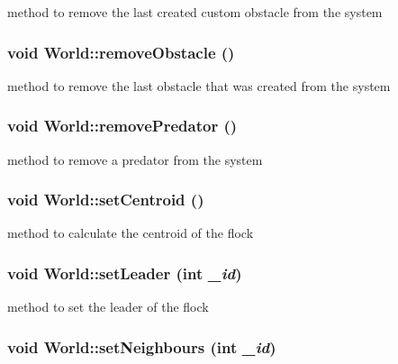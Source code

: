 method to remove the last created custom obstacle from the system \hypertarget{classWorld_a167f5e799706553e9b75ae7f7f28a665}{
\subsubsection[{removeObstacle}]{\setlength{\rightskip}{0pt plus 5cm}void World::removeObstacle ()}}
\label{classWorld_a167f5e799706553e9b75ae7f7f28a665}


method to remove the last obstacle that was created from the system \hypertarget{classWorld_a391e6a075dc5c22201a1a9d73d270af2}{
\subsubsection[{removePredator}]{\setlength{\rightskip}{0pt plus 5cm}void World::removePredator ()}}
\label{classWorld_a391e6a075dc5c22201a1a9d73d270af2}


method to remove a predator from the system \hypertarget{classWorld_ab65a3578f670b25f7805c87f0d5cf4df}{
\subsubsection[{setCentroid}]{\setlength{\rightskip}{0pt plus 5cm}void World::setCentroid ()}}
\label{classWorld_ab65a3578f670b25f7805c87f0d5cf4df}


method to calculate the centroid of the flock \hypertarget{classWorld_a2b306b8c1cc417a1d3d6ea9cde21b3a8}{
\subsubsection[{setLeader}]{\setlength{\rightskip}{0pt plus 5cm}void World::setLeader (int {\em \_\-id})}}
\label{classWorld_a2b306b8c1cc417a1d3d6ea9cde21b3a8}


method to set the leader of the flock \hypertarget{classWorld_ab122dcc42d0f92282674ba5decb749bc}{
\subsubsection[{setNeighbours}]{\setlength{\rightskip}{0pt plus 5cm}void World::setNeighbours (int {\em \_\-id})}}
\label{classWorld_ab122dcc42d0f92282674ba5decb749bc}


